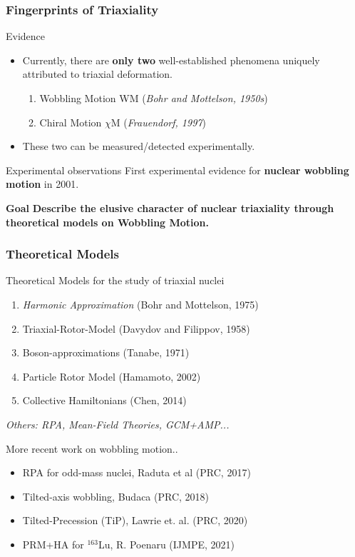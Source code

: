 \documentclass[
	11pt, %
]{beamer}
\begin{document}
\begin{frame}
	\frametitle{Fingerprints of Triaxiality}
	\begin{block}{Evidence \faSearch}
		\begin{itemize}
			\item Currently, there are \textbf{only two} well-established phenomena uniquely attributed to triaxial deformation.
			\begin{enumerate}
				\item Wobbling Motion WM (\emph{Bohr and Mottelson, 1950s})
				\item Chiral Motion $\chi$M (\emph{Frauendorf, 1997})
			\end{enumerate}
			\item These two can be measured/detected experimentally.
		\end{itemize}
	\end{block}
	\begin{alertblock}{Experimental observations \faSearch}
		First experimental evidence for \textbf{nuclear wobbling motion} in 2001.
	\end{alertblock}
	\begin{exampleblock}{\textbf{Goal} \faClipboard}
		\textbf{Describe the elusive character of nuclear triaxiality through theoretical models on Wobbling Motion.}
	\end{exampleblock}
\end{frame}

\begin{frame}
	\frametitle{Theoretical Models}
	\begin{block}{Theoretical Models for the study of triaxial nuclei}
		\begin{enumerate}
			\item \emph{Harmonic Approximation} (Bohr and Mottelson, 1975)
			\item Triaxial-Rotor-Model (Davydov and Filippov, 1958)
			\item Boson-approximations (Tanabe, 1971)
			\item Particle Rotor Model (Hamamoto, 2002)
			\item Collective Hamiltonians (Chen, 2014)
		\end{enumerate}
		\emph{Others: RPA, Mean-Field Theories, GCM+AMP...}
	\end{block}
	
	\begin{exampleblock}{More recent work on wobbling motion..}
		\begin{itemize}
			\item RPA for odd-mass nuclei, Raduta et al (PRC, 2017)
			\item Tilted-axis wobbling, Budaca (PRC, 2018)
			\item Tilted-Precession (TiP), Lawrie et. al. (PRC, 2020)
			\item PRM+HA for $^{163}$Lu, R. Poenaru (IJMPE, 2021)
		\end{itemize}
	\end{exampleblock}

\end{frame}
\end{document}
